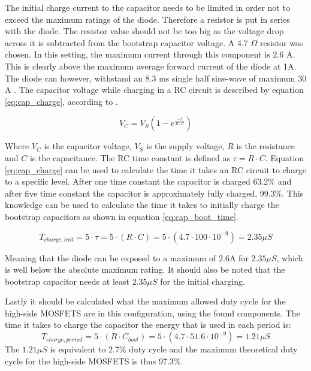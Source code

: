 The initial charge current to the capacitor needs to be limited in order not to exceed the maximum ratings of the diode.
Therefore a resistor is put in series with the diode.
The resistor value should not be too big as the voltage drop across it is subtracted from the bootstrap capacitor voltage.
A 4.7 $\Omega$ resistor was chosen. In this setting, the maximum current through this component is 2.6 A.
This is clearly above the maximum average forward current of the diode at 1A.
The diode can however, withstand an 8.3 ms single half sine-wave of maximum 30 A \cite{diode_ds}.
The capacitor voltage while charging in a RC circuit is described by equation \ref{eq:cap_charge}, according to \cite{prac_ele_for_inven}.

\begin{equation}
	V_C = V_S (1-e^{\frac{-t}{R\cdot C}})
	\label{eq:cap_charge}
\end{equation}

Where $V_C$ is the capacitor voltage, $V_S$ is the supply voltage, $R$ is the resistance and $C$ is the capacitance.
The RC time constant is defined as $\tau = R\cdot C$.
Equation \ref{eq:cap_charge} can be used to calculate the time it takes an RC circuit to charge to a specific level.
After one time constant the capacitor is charged 63.2\% and after five time constant the capacitor is approximately fully charged, 99.3\%.
This knowledge can be used to calculate the time it takes to initially charge the bootstrap capacitors as shown in equation \ref{eq:cap_boot_time}.

\begin{equation}
T_{charge,init} = 5\cdot \tau = 5\cdot (R \cdot C) = 5\cdot (4.7 \cdot 100 \cdot 10^{-9}) = 2.35 \mu S 
\label{eq:cap_boot_time}
\end{equation}

Meaning that the diode can be exposed to a maximum of 2.6A for $2.35 \mu S $, which is well below the absolute maximum rating.
It should also be noted that the bootstrap capacitor needs at least $2.35 \mu S $ for the initial charging.

Lastly it should be calculated what the maximum allowed duty cycle for the high-side MOSFETS are in this configuration, using the found components.
The time it takes to charge the capacitor the energy that is used in each period is:
\begin{equation}
	T_{charge,period} = 5\cdot (R \cdot C_{boot}) = 5\cdot (4.7 \cdot  51.6 \cdot 10^{-9}) = 1.21 \mu S 
\end{equation}
The $1.21 \mu S$ is equivalent to 2.7\% duty cycle and the maximum theoretical duty cycle for the high-side MOSFETS is thus 97.3\%.

